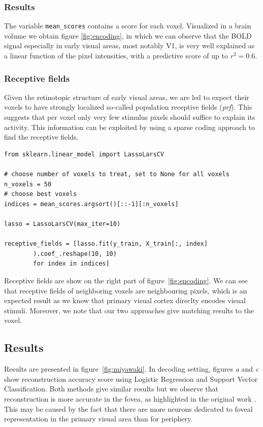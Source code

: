 \documentclass{frontiersSCNS} %
\begin{document}
\subsubsection{Results}
The variable \texttt{mean\_scores} contains a score for each voxel.
Visualized in a brain volume we obtain figure \ref{fig:encoding},
in which we can observe that the BOLD signal especially in early visual
areas, most notably V1, is very well explained as a linear function of
the pixel intensities, with a predictive score of up to \(r^2 = 0.6\).

\subsubsection{Receptive fields}
Given the retinotopic structure of early visual areas, we are led to
expect their voxels to have strongly localized so-called population
receptive fields (\textit{prf}). This suggests that per voxel only very
few stimulus pixels should suffice to explain its activity. This
information can be exploited by using a sparse coding approach to find
the receptive fields.

\begin{lstlisting}
from sklearn.linear_model import LassoLarsCV

# choose number of voxels to treat, set to None for all voxels
n_voxels = 50
# choose best voxels
indices = mean_scores.argsort()[::-1][:n_voxels]

lasso = LassoLarsCV(max_iter=10)

receptive_fields = [lasso.fit(y_train, X_train[:, index]
        ).coef_.reshape(10, 10)
        for index in indices]

\end{lstlisting}

Receptive fields are show on the right part of figure~\ref{fig:encoding}. We can
see that receptive fields of neighboring voxels are neighbouring pixels, which
is an expected result as we know that primary visual cortex direclty encodes
visual stimuli. Moreover, we note that our two approaches give matching results 
to the voxel.

\subsection{Results}
\label{sec:miyawaki_results}
Results are presented in figure~\ref{fig:miyawaki}.
In decoding setting, figures \textit{a} and \textit{c} show reconstruction
accuracy score using Logistic Regression and Support Vector Classification.
Both methods give similar results but we observe that reconstruction is more
accurate in the fovea, as highlighted
in the original work \citep{miyawaki2008}.
This may be caused by the fact that there are more neurons dedicated to foveal
representation in the primary visual area than for periphery.
\end{document}

